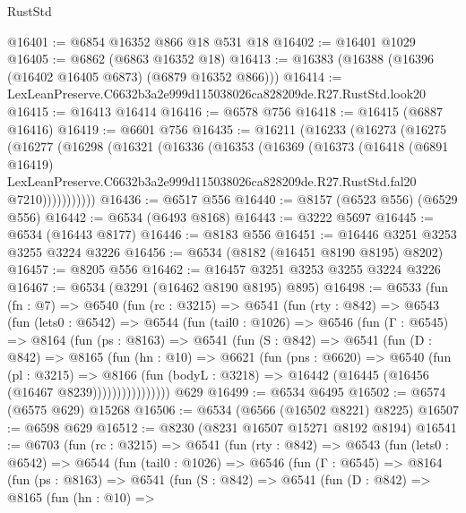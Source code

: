\begin{lexlean}{RustStd}
\begin{coremodule}
@16401 := @6854 @16352 @866 @18 @531 @18
@16402 := @16401 @1029
@16405 := @6862 (@6863 @16352 @18)
@16413 := @16383 (@16388 (@16396 (@16402 @16405 @6873) (@6879 @16352 @866)))
@16414 := LexLeanPreserve.C6632b3a2e999d115038026ca828209de.R27.RustStd.look20
@16415 := @16413 @16414
@16416 := @6578 @756
@16418 := @16415 (@6887 @16416)
@16419 := @6601 @756
@16435 := @16211
    (@16233
      (@16273
        (@16275
          (@16277
            (@16298
              (@16321
                (@16336
                  (@16353
                    (@16369
                      (@16373
                        (@16418
                          (@6891 @16419)
                          LexLeanPreserve.C6632b3a2e999d115038026ca828209de.R27.RustStd.fal20
                          @7210)))))))))))
@16436 := @6517 @556
@16440 := @8157 (@6523 @556) (@6529 @556)
@16442 := @6534 (@6493 @8168)
@16443 := @3222 @5697
@16445 := @6534 (@16443 @8177)
@16446 := @8183 @556
@16451 := @16446 @3251 @3253 @3255 @3224 @3226
@16456 := @6534 (@8182 (@16451 @8190 @8195) @8202)
@16457 := @8205 @556
@16462 := @16457 @3251 @3253 @3255 @3224 @3226
@16467 := @6534 (@3291 (@16462 @8190 @8195) @895)
@16498 := @6533
    (fun (fn : @7) =>
    @6540
      (fun (rc : @3215) =>
      @6541
        (fun (rty : @842) =>
        @6543
          (fun (lets0 : @6542) =>
          @6544
            (fun (tail0 : @1026) =>
            @6546
              (fun (Γ : @6545) =>
              @8164
                (fun (ps : @8163) =>
                @6541
                  (fun (S : @842) =>
                  @6541
                    (fun (D : @842) =>
                    @8165
                      (fun (hn : @10) =>
                      @6621
                        (fun (pns : @6620) =>
                        @6540
                          (fun (pl : @3215) =>
                          @8166
                            (fun (bodyL : @3218) =>
                            @16442 (@16445 (@16456 (@16467 @8239))))))))))))))))
    @629
@16499 := @6534 @6495
@16502 := @6574 (@6575 @629) @15268
@16506 := @6534 (@6566 (@16502 @8221) @8225)
@16507 := @6598 @629
@16512 := @8230 (@8231 @16507 @15271 @8192 @8194)
@16541 := @6703
    (fun (rc : @3215) =>
    @6541
      (fun (rty : @842) =>
      @6543
        (fun (lets0 : @6542) =>
        @6544
          (fun (tail0 : @1026) =>
          @6546
            (fun (Γ : @6545) =>
            @8164
              (fun (ps : @8163) =>
              @6541
                (fun (S : @842) =>
                @6541
                  (fun (D : @842) =>
                  @8165
                    (fun (hn : @10) =>

\end{coremodule}
\end{lexlean}
